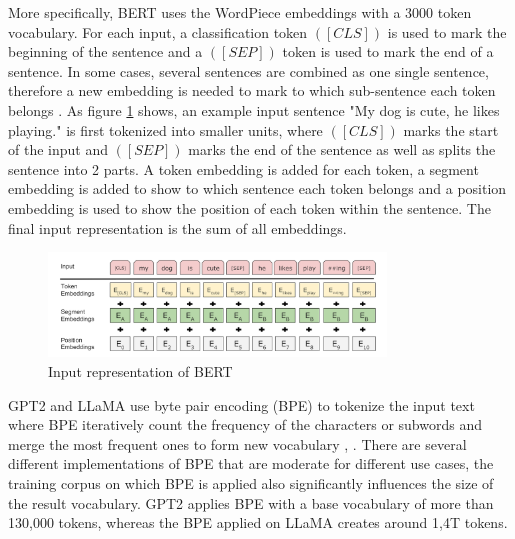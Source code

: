 \documentclass[runningheads]{llncs}
\begin{document}
\noindent \newline
More specifically, BERT uses the WordPiece embeddings \cite{Wu16} with a 3000 token vocabulary. For each input, a classification token $([CLS])$ is used to mark the beginning of the sentence and a $([SEP])$ token is
used to mark the end of a sentence. In some cases, several sentences are combined as one single sentence, therefore a new embedding is needed to mark to which sub-sentence each token belongs \cite{Devlin18}.
As figure \ref{fig:bert_input} shows, an example input sentence "My dog is cute, he likes playing." is first tokenized into smaller units, where $([CLS])$ marks the start of the input and 
$([SEP])$ marks the end of the sentence as well as splits the sentence into 2 parts. A token embedding is added for each token, a segment embedding is added to show to which sentence each token belongs and
a position embedding is used to show the position of each token within the sentence. The final input representation is the sum of all embeddings.
\begin{figure}[htbp]
  \centering
  \includegraphics[width=0.8\textwidth]{BERT input repres.png}
  \caption{Input representation of BERT \cite{Devlin18}}
  \label{fig:bert_input}
\end{figure}

\noindent \newline
GPT2 and LLaMA use byte pair encoding (BPE) \cite{Sennrich15} to tokenize the input text where BPE iteratively count the frequency of the characters or subwords and merge the most frequent ones
to form new vocabulary \cite{Radford19}, \cite{Touvron23}. There are several different implementations of BPE that are moderate for different use cases, the training corpus on which BPE is applied also
significantly influences the size of the result vocabulary. GPT2 applies BPE with a base vocabulary of more than 130,000 tokens, whereas the BPE applied on LLaMA creates around 1,4T tokens.
\end{document}
